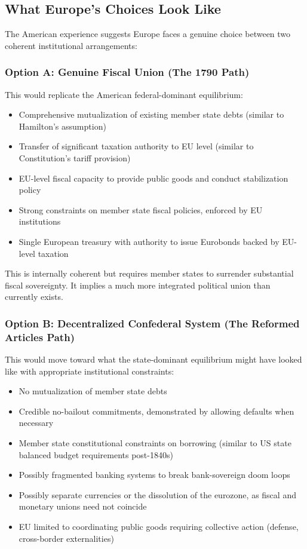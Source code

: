 \documentclass[12pt]{article}
\begin{document}
\subsection{What Europe's Choices Look Like}

The American experience suggests Europe faces a genuine choice between two coherent institutional arrangements:

\subsubsection{Option A: Genuine Fiscal Union (The 1790 Path)}

This would replicate the American federal-dominant equilibrium:
\begin{itemize}
\item Comprehensive mutualization of existing member state debts (similar to Hamilton's assumption)
\item Transfer of significant taxation authority to EU level (similar to Constitution's tariff provision)
\item EU-level fiscal capacity to provide public goods and conduct stabilization policy
\item Strong constraints on member state fiscal policies, enforced by EU institutions
\item Single European treasury with authority to issue Eurobonds backed by EU-level taxation
\end{itemize}

This is internally coherent but requires member states to surrender substantial fiscal sovereignty. It implies a much more integrated political union than currently exists.

\subsubsection{Option B: Decentralized Confederal System (The Reformed Articles Path)}

This would move toward what the state-dominant equilibrium might have looked like with appropriate institutional constraints:
\begin{itemize}
\item No mutualization of member state debts
\item Credible no-bailout commitments, demonstrated by allowing defaults when necessary
\item Member state constitutional constraints on borrowing (similar to US state balanced budget requirements post-1840s)
\item Possibly fragmented banking systems to break bank-sovereign doom loops
\item Possibly separate currencies or the dissolution of the eurozone, as fiscal and monetary unions need not coincide
\item EU limited to coordinating public goods requiring collective action (defense, cross-border externalities)
\end{itemize}
\end{document}
